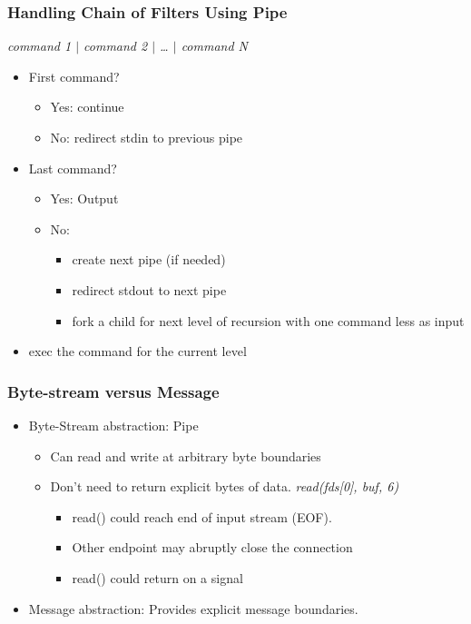 \documentclass[12pt]{article}
\begin{document}
\subsubsection{Handling Chain of Filters Using Pipe}
\emph{command 1 $|$ command 2 $|$ … $|$ command N}
\begin{itemize}
    \item First command? \begin{itemize}
        \item Yes: continue
        \item No: redirect stdin to previous pipe
    \end{itemize}
    \item Last command? \begin{itemize}
        \item Yes: Output
        \item No: \begin{itemize}
            \item create next pipe (if needed)
            \item redirect stdout to next pipe
            \item fork a child for next level of recursion with one command less as input
        \end{itemize}
    \end{itemize}
    \item exec the command for the current level
\end{itemize}
\subsubsection{Byte-stream versus Message}
\begin{itemize}
    \item Byte-Stream abstraction: Pipe \begin{itemize}
        \item Can read and write at arbitrary byte boundaries
        \item Don't need to return explicit bytes of data. \emph{read(fds[0], buf, 6)} \begin{itemize}
            \item read() could reach end of input stream (EOF).
            \item Other endpoint may abruptly close the connection
            \item read() could return on a signal
        \end{itemize}
    \end{itemize}
    \item Message abstraction: Provides explicit message boundaries.
\end{itemize}
\end{document}

